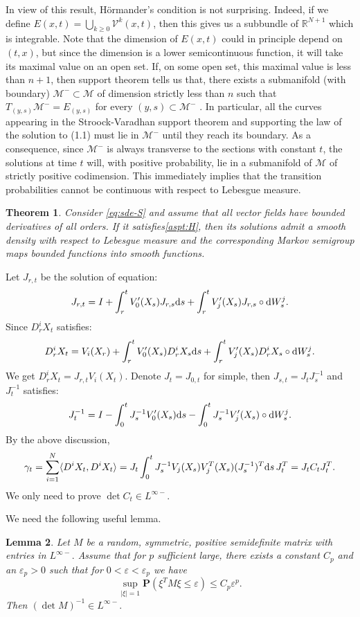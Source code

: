\documentclass[twoside, 12pt]{book}
\numberwithin{equation}{chapter}
\newtheorem{theorem}{Theorem}[section]
\newtheorem{lemma}[theorem]{Lemma}
\def\cM{{\mathcal M}}
\def\mR{{\mathbb R}}
\def\bP{{\mathbf P}}
\def\sV{{\mathscr V}}
\def\<{\langle}
\def\>{\rangle}
\def\geq{\geqslant}
\def\leq{\leqslant}
\def\d{\text{\rm{d}}}
\def\eps{\varepsilon}
\begin{document}
	In view of this result, H\"ormander’s condition is not surprising. Indeed, if we define $E(x,t) = \bigcup_{k\geq 0} \sV^k(x,t)$, then this gives us a subbundle of $\mR^{N+1}$ which
	is integrable. Note that the dimension of $E(x,t)$ could in principle depend on $(t, x)$, but since the dimension is a lower semicontinuous function, it will take its maximal value on an open set. If, on some open set, this maximal value is less than $n + 1$, then support theorem tells us that, there exists a submanifold (with boundary) $\cM^- \subset \cM$ of dimension strictly less than $n$ such that $T_{(y,s)}\cM^- = E_{(y,s)}$ for every $(y, s) \subset \cM^-$ . In particular, all the curves appearing in the Stroock-Varadhan support theorem and supporting the law of the solution to (1.1) must lie in $\cM^-$ until they reach its boundary. As a consequence, since $\cM^-$ is always transverse to the sections with constant $t$, the solutions at time $t$ will, with positive probability, lie in a submanifold of $\cM$ of strictly positive codimension. This immediately implies that the transition probabilities cannot be continuous with respect to Lebesgue measure.
	
	\begin{theorem}
	Consider \eqref{eq:sde-S} and assume that all vector fields have bounded derivatives of all orders. If it satisfies\eqref{aspt:H}, then its solutions admit a smooth density with respect to Lebesgue measure and the corresponding Markov semigroup maps bounded functions into smooth functions.
	\end{theorem}
	
	Let $J_{r,t}$ be the solution of equation: 
	\begin{align}
		J_{r,t}=I+\int_r^t V'_0(X_s) J_{r,s}\d s+\int_r^t V'_j(X_s) J_{r,s}\circ \d W^j_s. 
	\end{align}
	Since $D^i_rX_t$ satisfies: 
	$$D^i_rX_t=V_i(X_r)+\int_r^t V'_0(X_s) D^i_r X_s \d s+\int_r^t V'_j(X_s)D^i_rX_s\circ \d W^j_s. $$
	We get $D^i_rX_t=J_{r,t} V_i(X_t)$. Denote $J_t=J_{0,t}$ for simple, then $J_{s,t}=J_{t}J_{s}^{-1}$ and $J_{t}^{-1}$ satisfies: 
	$$J_t^{-1}=I-\int_0^t J_s^{-1} V'_0(X_s)\d s-\int_0^t J_s^{-1} V'_j(X_s)\circ\d W_s^j. $$
	By the above discussion, 
	$$
	\gamma_t = \sum_{i=1}^N\<D^i X_t, D^i X_t\>=J_t\int_0^t J^{-1}_s V_j(X_s)V^{T}_j(X_s)(J^{-1}_s)^T \d s \,J^T_t=J_t C_t J^T_t. 
	$$
	We only need to prove $\det C_t\in L^{\infty-}$. 
	
	We need the following useful lemma. 
	
	\begin{lemma}\label{Tail}
	Let $M$ be a random, symmetric, positive semidefinite matrix with entries in  $L^{\infty-}.$ Assume that for $p$ sufficient large, there exists a constant $C_p$ and an $\eps_p > 0$ such that
	for $0<\eps<\eps_p$ we have
	$$ \sup_{|\xi|=1}\bP  (\xi^T M \xi\leq \eps)\leq C_p \eps^p. $$
	Then $(\det M)^{-1} \in L^{\infty-}. $
	\end{lemma}
	
\end{document}
